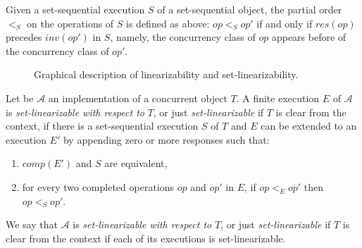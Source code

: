 Given a set-sequential execution \(S\) of a set-sequential object, the partial order \(<_S\) on the operations of \(S\) is defined as above: \(op <_S op'\) if and only if \(res(op)\) precedes \(inv(op')\) in \(S\), namely, the concurrency class of \(op\) appears before of the concurrency class of \(op'\).

\begin{figure}[!ht]
  \centering
  \hfill
  \caption{\label{fig-example-linear-and-set-linear}Graphical
    description of linearizability and set-linearizability.
}
\end{figure}


\begin{definition}
    Let be \(\mathcal{A}\) an implementation of a concurrent object \(T\). A finite execution \(E\) of \(\mathcal{A}\) is \emph{set-linearizable with respect to} \(T\), or just \emph{set-linearizable} if \(T\) is clear from the context, if there is a set-sequential execution \(S\) of \(T\) and \(E\) can be extended to an execution \(E'\) by appending zero or more responses such that:

    \begin{enumerate}
        \item \(comp(E')\) and \(S\) are equivalent,
        \item for every two completed operations \(op\) and \(op'\) in \(E\), if \(op <_E op'\) then \(op <_S op'\).
    \end{enumerate}

    We say that \(\mathcal{A}\) is \emph{set-linearizable with respect to} \(T\), or just \emph{set-linearizable} if \(T\) is clear from the context if each of its executions is set-linearizable.
  \end{definition}

